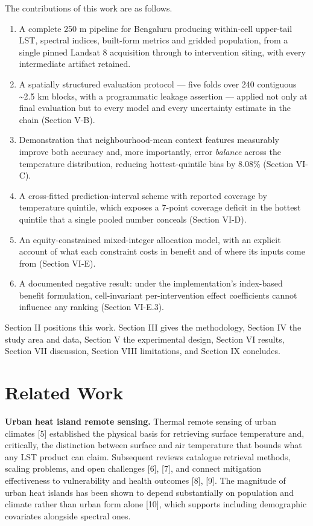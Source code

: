 The contributions of this work are as follows.

\begin{enumerate}
\def\labelenumi{\arabic{enumi}.}
\tightlist
\item
  A complete 250 m pipeline for Bengaluru producing within-cell upper-tail LST, spectral indices,
  built-form metrics and gridded population, from a single pinned Landsat 8 acquisition through to
  intervention siting, with every intermediate artifact retained.
\item
  A spatially structured evaluation protocol --- five folds over 240 contiguous \textasciitilde2.5 km blocks, with
  a programmatic leakage assertion --- applied not only at final evaluation but to every model and
  every uncertainty estimate in the chain (Section V-B).
\item
  Demonstration that neighbourhood-mean context features measurably improve both accuracy and, more
  importantly, error \emph{balance} across the temperature distribution, reducing hottest-quintile bias
  by 8.08\% (Section VI-C).
\item
  A cross-fitted prediction-interval scheme with reported coverage by temperature quintile, which
  exposes a 7-point coverage deficit in the hottest quintile that a single pooled number conceals
  (Section VI-D).
\item
  An equity-constrained mixed-integer allocation model, with an explicit account of what each
  constraint costs in benefit and of where its inputs come from (Section VI-E).
\item
  A documented negative result: under the implementation's index-based benefit formulation,
  cell-invariant per-intervention effect coefficients cannot influence any ranking (Section VI-E.3).
\end{enumerate}

Section II positions this work. Section III gives the methodology, Section IV the study area and
data, Section V the experimental design, Section VI results, Section VII discussion, Section VIII
limitations, and Section IX concludes.

\section{Related Work}\label{ii.-related-work}

\textbf{Urban heat island remote sensing.} Thermal remote sensing of urban climates {[}5{]} established the
physical basis for retrieving surface temperature and, critically, the distinction between surface and
air temperature that bounds what any LST product can claim. Subsequent reviews catalogue retrieval
methods, scaling problems, and open challenges {[}6{]}, {[}7{]}, and connect mitigation effectiveness to
vulnerability and health outcomes {[}8{]}, {[}9{]}. The magnitude of urban heat islands has been shown to
depend substantially on population and climate rather than urban form alone {[}10{]}, which supports
including demographic covariates alongside spectral ones.

